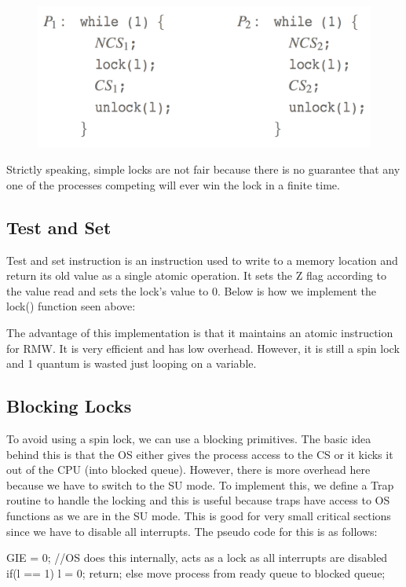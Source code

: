 \documentclass{hw}
\begin{document}
\begin{figure}[H]
  \centering
  \includegraphics[scale=.4]{img/lock}
\end{figure}

Strictly speaking, simple locks are not fair because there is no guarantee that
any one of the processes competing will ever win the lock in a finite time. 

\subsection{Test and Set}
Test and set instruction is an instruction used to write to a memory location 
and return its old value as a single atomic operation. It sets the Z flag 
according to the value read and sets the lock's value to 0. Below is how we
implement the lock() function seen above:
The advantage of this implementation is that it maintains an atomic instruction 
for RMW. It is very efficient and has low overhead. However, it is still a 
spin lock and 1 quantum is wasted just looping on a variable.
    
\subsection{Blocking Locks}
To avoid using a spin lock, we can use a blocking primitives. The basic idea behind
this is that the OS either gives the process access to the CS or it kicks it out
of the CPU (into blocked queue). However, there is more overhead here because we
have to switch to the SU mode. To implement this, we define a Trap routine to handle
the locking and this is useful because traps have access to OS functions as we are
in the SU mode. This is good for very small critical sections since we have to 
disable all interrupts. The pseudo code for this is as follows:
\begin{C}
GIE = 0; //OS does this internally, acts as a lock as all interrupts are disabled
if(l == 1){
  l = 0;
  return;
}
else{
  move process from ready queue to blocked queue;
}
\end{C}
\end{document}
